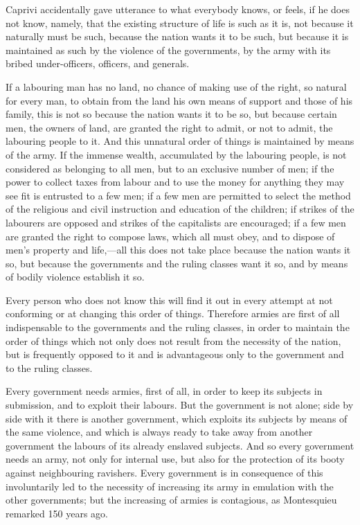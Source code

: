 \documentclass{book}
\begin{document}
Caprivi accidentally gave utterance to what everybody knows, or feels, if he does not know, namely, that the existing structure of life is such as it is, not because it naturally must be such, because the nation wants it to be such, but because it is maintained as such by the violence of the governments, by the army with its bribed under-officers, officers, and generals.

If a labouring man has no land, no chance of making use of the right, so natural for every man, to obtain from the land his own means of support and those of his family, this is not so because the nation wants it to be so, but because certain men, the owners of land, are granted the right to admit, or not to admit, the labouring people to it. And this unnatural order of things is maintained by means of the army. If the immense wealth, accumulated by the labouring people, is not considered as belonging to all men, but to an exclusive number of men; if the power to collect taxes from labour and to use the money for anything they may see fit is entrusted to a few men; if a few men are permitted to select the method of the religious and civil instruction and education of the children; if strikes of the labourers are opposed and strikes of the capitalists are encouraged; if a few men are granted the right to compose laws, which all must obey, and to dispose of men’s property and life,—all this does not take place because the nation wants it so, but because the governments and the ruling classes want it so, and by means of bodily violence establish it so.

Every person who does not know this will find it out in every attempt at not conforming or at changing this order of things. Therefore armies are first of all indispensable to the governments and the ruling classes, in order to maintain the order of things which not only does not result from the necessity of the nation, but is frequently opposed to it and is advantageous only to the government and to the ruling classes.

Every government needs armies, first of all, in order to keep its subjects in submission, and to exploit their labours. But the government is not alone; side by side with it there is another government, which exploits its subjects by means of the same violence, and which is always ready to take away from another government the labours of its already enslaved subjects. And so every government needs an army, not only for internal use, but also for the protection of its booty against neighbouring ravishers. Every government is in consequence of this involuntarily led to the necessity of increasing its army in emulation with the other governments; but the increasing of armies is contagious, as Montesquieu remarked 150 years ago.
\end{document}
